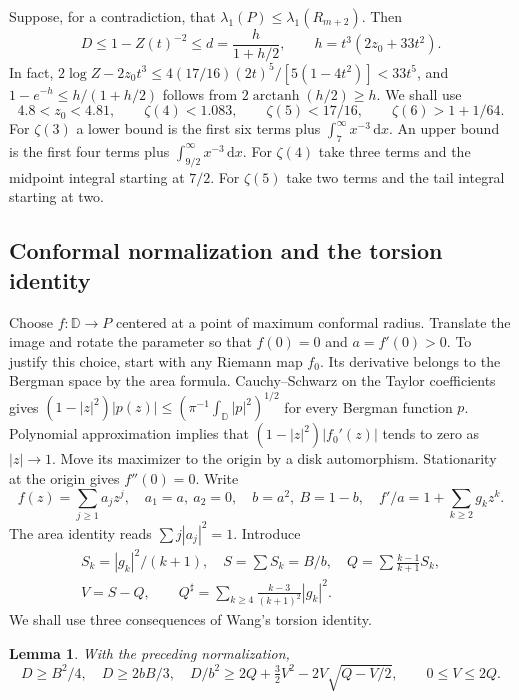 \documentclass[11pt,a4paper,reqno]{amsart}
\newtheorem{lemma}[theorem]{Lemma}
\theoremstyle{remark}
\numberwithin{equation}{section}
\newcommand{\dd}{\,\mathrm d}
\newcommand{\D}{\mathbb D}
\begin{document}
Suppose, for a contradiction, that $\lambda_1(P)\le\lambda_1(R_{m+2})$. Then
\begin{equation}\label{eq:dupper}
  D\le1-Z(t)^{-2}\le d=\frac{h}{1+h/2},\qquad h=t^3(2z_0+33t^2).
\end{equation}
In fact, $2\log Z-2z_0t^3\le4(17/16)(2t)^5/[5(1-4t^2)]<33t^5$, and
$1-e^{-h}\le h/(1+h/2)$ follows from $2\operatorname{arctanh}(h/2)\ge h$.
We shall use
\[
 4.8<z_0<4.81,\qquad \zeta(4)<1.083,\qquad \zeta(5)<17/16,\qquad
 \zeta(6)>1+1/64 .
\]
For $\zeta(3)$ a lower bound is the first six terms plus
$\int_7^\infty x^{-3}\dd x$. An upper bound is the first four terms plus
$\int_{9/2}^\infty x^{-3}\dd x$. For $\zeta(4)$ take three terms and the
midpoint integral starting at $7/2$. For $\zeta(5)$ take two terms and the
tail integral starting at two.

\subsection{Conformal normalization and the torsion identity}\label{sec:torsiontool}
Choose $f:\D\to P$ centered at a point of maximum conformal radius.
Translate the image and rotate the parameter so that $f(0)=0$ and
$a=f'(0)>0$. To justify this choice, start with any Riemann map $f_0$.
Its derivative belongs to the Bergman space by the area formula.
Cauchy--Schwarz on the Taylor coefficients gives
$(1-|z|^2)|p(z)|\le(\pi^{-1}\int_\D|p|^2)^{1/2}$ for every Bergman function
$p$. Polynomial approximation implies that $(1-|z|^2)|f_0'(z)|$ tends to
zero as $|z|\to1$. Move its maximizer to the origin by a disk automorphism.
Stationarity at the origin gives $f''(0)=0$. Write
\[
 f(z)=\sum_{j\ge1}a_jz^j,\quad a_1=a,\ a_2=0,\quad
 b=a^2,\ B=1-b,\quad f'/a=1+\sum_{k\ge2}g_k z^k.
\]
The area identity reads $\sum j|a_j|^2=1$. Introduce
\[
 \begin{gathered}
 S_k=|g_k|^2/(k+1),\quad S=\sum S_k=B/b,\quad Q=\sum\frac{k-1}{k+1}S_k,\\
 V=S-Q,\qquad Q^\sharp=\sum_{k\ge4}\frac{k-3}{(k+1)^2}|g_k|^2 .
 \end{gathered}
\]
We shall use three consequences of Wang's torsion identity.

\begin{lemma}\label{lem:torsion}
With the preceding normalization,
\begin{equation}\label{eq:coercive}
 D\ge B^2/4,\quad D\ge2bB/3,\quad
 D/b^2\ge2Q+\tfrac32V^2-2V\sqrt{Q-V/2},\qquad 0\le V\le2Q .
\end{equation}
\end{lemma}
\end{document}
